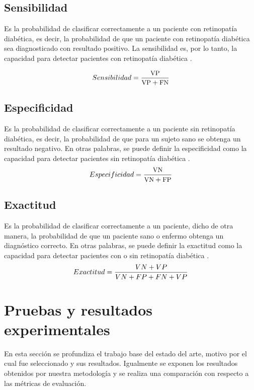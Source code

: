 \subsection{Sensibilidad}
Es la probabilidad de clasificar correctamente a un paciente con retinopatía diabética, es decir, la probabilidad de que  un paciente con retinopatía diabética sea diagnosticado con resultado positivo. La sensibilidad es, por lo tanto, la capacidad para detectar pacientes con retinopatía diabética \cite{pita2003pruebas}.

\begin{equation}
\label{eq:sensibilidad}
\small	Sensibilidad=\frac{\text{VP}}{\text{VP} + \text{FN}}
\end{equation}

\subsection{Especificidad}
Es la probabilidad de clasificar correctamente a un paciente sin retinopatía diabética, es decir, la probabilidad de que para un sujeto sano se obtenga un resultado negativo. En otras palabras, se puede definir la especificidad como la capacidad para detectar pacientes sin retinopatía diabética \cite{pita2003pruebas}. 
\begin{equation}
\label{eq:especificidad}
\small	Especificidad=\frac{\text{VN}}{\text{VN} + \text{FP}}
\end{equation}

\subsection{Exactitud}
Es la probabilidad de clasificar correctamente a un paciente, dicho de otra manera, la probabilidad de que un paciente sano o enfermo obtenga un diagnóstico correcto. En otras palabras, se puede definir la exactitud como la capacidad para detectar pacientes con o sin  retinopatía diabética \cite{pita2003pruebas}. 
\begin{equation}
\label{eq:exactitud}
\small	Exactitud = \frac{VN + VP}{VN + FP + FN + VP}
\end{equation}

\section{Pruebas y resultados experimentales}
En esta sección  se profundiza el trabajo base del estado del arte, motivo por el cual fue seleccionado y sus resultados. Igualmente  se exponen los resultados obtenidos por nuestra metodología y se realiza una comparación con respecto a las métricas de evaluación.

